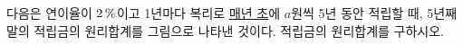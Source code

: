 다음은 연이율이 $2\mkern3mu \%$이고 1년마다 복리로 \underline{매년 초}에 $a$원씩 5년 동안 적립할 때, 5년째 말의 적립금의 원리합계를 그림으로 나타낸 것이다. 적립금의 원리합계를 구하시오. 
\par\smallskip\begin{center}\resizebox{\ifdim\width>\linewidth\linewidth\else\width\fi}{!}{}\end{center}
